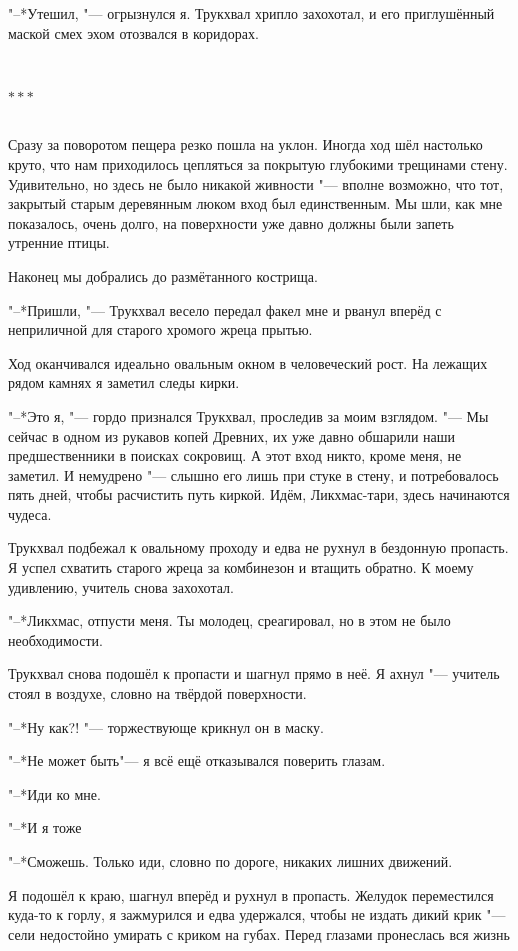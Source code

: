 \documentclass[a4paper,10pt,fleqn]{book}
\newcommand{\ldotst}{\so{...}\xspace}
\newcommand{\ldotsq}{\so{?\hbox{\hspace{-.212em}}..}\xspace}
\newcommand{\razd}{~\\{\centering\Large\bfseries$\ast \ast \ast$\par}~\\}
\begin{document}
"--*Утешил, "--- огрызнулся я.
Трукхвал хрипло захохотал, и его приглушённый маской смех эхом отозвался в коридорах.

\razd

Сразу за поворотом пещера резко пошла на уклон.
Иногда ход шёл настолько круто, что нам приходилось цепляться за покрытую глубокими трещинами стену.
Удивительно, но здесь не было никакой живности "--- вполне возможно, что тот, закрытый старым деревянным люком вход был единственным.
Мы шли, как мне показалось, очень долго, на поверхности уже давно должны были запеть утренние птицы.

Наконец мы добрались до размётанного кострища.

"--*Пришли, "--- Трукхвал весело передал факел мне и рванул вперёд с неприличной для старого хромого жреца прытью.

Ход оканчивался идеально овальным окном в человеческий рост.
На лежащих рядом камнях я заметил следы кирки.

"--*Это я, "--- гордо признался Трукхвал, проследив за моим взглядом.
"--- Мы сейчас в одном из рукавов копей Древних, их уже давно обшарили наши предшественники в поисках сокровищ.
А этот вход никто, кроме меня, не заметил.
И немудрено "--- слышно его лишь при стуке в стену, и потребовалось пять дней, чтобы расчистить путь киркой.
Идём, Ликхмас-тари, здесь начинаются чудеса.

Трукхвал подбежал к овальному проходу\ldotst и едва не рухнул в бездонную пропасть.
Я успел схватить старого жреца за комбинезон и втащить обратно.
К моему удивлению, учитель снова захохотал.

"--*Ликхмас, отпусти меня.
Ты молодец, среагировал, но в этом не было необходимости.

Трукхвал снова подошёл к пропасти\ldotst и шагнул прямо в неё.
Я ахнул "--- учитель стоял в воздухе, словно на твёрдой поверхности.

"--*Ну как?! "--- торжествующе крикнул он в маску.

"--*Не может быть\ldotst "--- я всё ещё отказывался поверить глазам.

"--*Иди ко мне.

"--*И я тоже\ldotsq

"--*Сможешь.
Только иди, словно по дороге, никаких лишних движений.

Я подошёл к краю, шагнул вперёд\ldotst и рухнул в пропасть.
Желудок переместился куда-то к горлу, я зажмурился и едва удержался, чтобы не издать дикий крик "--- сели недостойно умирать с криком на губах.
Перед глазами пронеслась вся жизнь\ldotst
\end{document}
